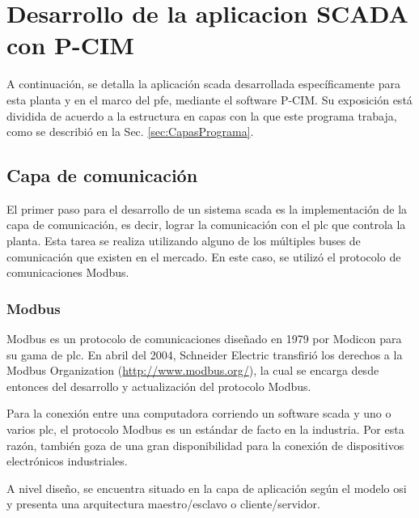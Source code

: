 \section{Desarrollo de la aplicacion SCADA con P-CIM}
A continuación, se detalla la aplicación \gls{scada} desarrollada 
específicamente para esta planta y en el marco del \gls{pfe}, mediante el
software P-CIM. Su exposición está dividida de acuerdo a la estructura en capas
con la que este programa trabaja, como se describió en la Sec.
\ref{sec:CapasPrograma}.

\subsection{Capa de comunicación}
\label{subsec:CapaComunicacion}
El primer paso para el desarrollo de un sistema \gls{scada} es la 
implementación de la capa de comunicación, es decir, lograr la 
comunicación con el \gls{plc} que controla la planta. Esta tarea se realiza
utilizando alguno de los múltiples buses de comunicación que existen en el
mercado. En este caso, se utilizó el protocolo de comunicaciones Modbus.

\subsubsection{Modbus}
Modbus es un protocolo de comunicaciones diseñado en 1979 por Modicon para su 
gama de \gls{plc}. En abril del 2004, Schneider Electric transfirió los 
derechos a la Modbus Organization (\url{http://www.modbus.org/}), la cual se 
encarga desde entonces del desarrollo y actualización del protocolo Modbus.

Para la conexión entre una computadora corriendo un software \gls{scada} y uno
o varios \gls{plc}, el protocolo Modbus es un estándar de facto en la industria.
Por esta razón, también goza de una gran disponibilidad para la conexión de
dispositivos electrónicos industriales.

A nivel diseño, se encuentra situado en
la capa de aplicación según el modelo \gls{osi} y presenta una arquitectura 
maestro/esclavo o cliente/servidor.



